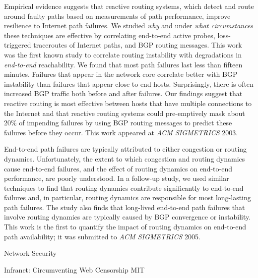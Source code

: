 \documentclass{article}
\begin{document}
\begin{cv}{}
    Empirical evidence suggests that reactive routing systems, which
    detect and route around faulty paths based on measurements of path
    performance, improve resilience to Internet path failures.  We
    studied {\em why} and under {\em what 
    circumstances} these techniques are effective by
    correlating end-to-end active probes, loss-triggered traceroutes of
    Internet paths, and BGP routing messages.  This work was the first known
    study to correlate routing instability with degradations in {\em
    end-to-end} reachability. We found that most
    path failures last less than fifteen minutes.  Failures that appear
    in the network core correlate better with BGP instability than
    failures that appear close to end hosts.  Surprisingly, there is
    often increased BGP traffic both before and after failures.  Our
    findings suggest that reactive routing is most effective between
    hosts that have multiple connections to the Internet and that
    reactive routing systems could pre-emptively mask about 20\% of
    impending failures by using BGP routing messages to
    predict these failures before they occur.  This work appeared at {\em ACM
    SIGMETRICS} 2003.

    End-to-end path failures are typically attributed to either
    congestion or routing dynamics. Unfortunately, the extent to which
    congestion and routing dynamics cause end-to-end failures, and the
    effect of routing dynamics on end-to-end performance, are poorly
    understood.  In a follow-up study, we used similar techniques to
    find that routing dynamics contribute significantly to end-to-end
    failures and, in particular, routing dynamics are responsible for
    most long-lasting path failures.  The study also finds that
    long-lived end-to-end path failures that involve routing dynamics
    are typically caused by BGP convergence or instability.  This work is
    the first to quantify the impact of routing dynamics on end-to-end
    path availability; it was submitted to {\em ACM SIGMETRICS} 2005.



{\df Network Security}

{\mf Infranet: Circumventing Web Censorship} \hfill MIT
\vspace*{-0.1in}
    

\end{cv}
\end{document}
